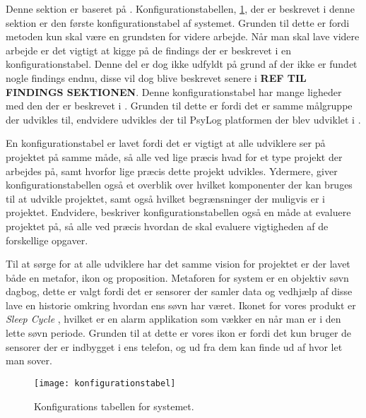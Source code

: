 Denne sektion er baseret på \citet{art:essence}.
Konfigurationstabellen, \cref{tab:konfigurationsTabel}, der er beskrevet i denne sektion er den første konfigurationstabel af systemet.
Grunden til dette er fordi metoden kun skal være en grundsten for videre arbejde.
Når man skal lave videre arbejde er det vigtigt at kigge på de findings der er beskrevet i en konfigurationstabel.
Denne del er dog ikke udfyldt på grund af der ikke er fundet nogle findings endnu, disse vil dog blive beskrevet senere i \textbf{REF TIL FINDINGS SEKTIONEN}.
Denne konfigurationstabel har mange ligheder med den der er beskrevet i \citet{misc:faellesrapp}.
Grunden til dette er fordi det er samme målgruppe der udvikles til, endvidere udvikles der til PsyLog platformen der blev udviklet i \citet{misc:faellesrapp}.

En konfigurationstabel er lavet fordi det er vigtigt at alle udviklere ser på projektet på samme måde, så alle ved lige præcis hvad for et type projekt der arbejdes på, samt hvorfor lige præcis dette projekt udvikles.
Ydermere, giver konfigurationstabellen også et overblik over hvilket komponenter der kan bruges til at udvikle projektet, samt også hvilket begrænsninger der muligvis er i projektet.
Endvidere, beskriver konfigurationstabellen også en måde at evaluere projektet på, så alle ved præcis hvordan de skal evaluere vigtigheden af de forskellige opgaver.

Til at sørge for at alle udviklere har det samme vision for projektet er der lavet både en metafor, ikon og proposition.
Metaforen for system er en objektiv søvn dagbog, dette er valgt fordi det er sensorer der samler data og vedhjælp af disse lave en historie omkring hvordan ens søvn har været.
Ikonet for vores produkt er \textit{Sleep Cycle} \citep{misc:sleepCycle}, hvilket er en alarm applikation som vækker en når man er i den lette søvn periode.
Grunden til at dette er vores ikon er fordi det kun bruger de sensorer der er indbygget i ens telefon, og ud fra dem kan finde ud af hvor let man sover.

\begin{figure}\centering
\texttt{[image: konfigurationstabel]}
\caption{Konfigurations tabellen for systemet.}
\label{tab:konfigurationsTabel}
\end{figure}
\newpage